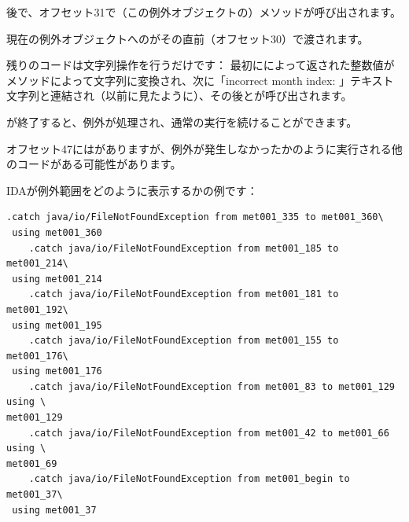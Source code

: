 後で、オフセット31で（この例外オブジェクトの）メソッドが呼び出されます。

現在の例外オブジェクトへのがその直前（オフセット30）で渡されます。

残りのコードは文字列操作を行うだけです：
最初にによって返された整数値がメソッドによって文字列に変換され、次に「incorrect month index: 」テキスト文字列と連結され（以前に見たように）、その後とが呼び出されます。

が終了すると、例外が処理され、通常の実行を続けることができます。

オフセット47にはがありますが、例外が発生しなかったかのように実行される他のコードがある可能性があります。

IDAが例外範囲をどのように表示するかの例です：

\begin{lstlisting}[caption=著者のコンピューターで見つかったランダムな.classファイルから]
    .catch java/io/FileNotFoundException from met001_335 to met001_360\
 using met001_360
    .catch java/io/FileNotFoundException from met001_185 to met001_214\
 using met001_214
    .catch java/io/FileNotFoundException from met001_181 to met001_192\
 using met001_195
    .catch java/io/FileNotFoundException from met001_155 to met001_176\
 using met001_176
    .catch java/io/FileNotFoundException from met001_83 to met001_129 using \
met001_129
    .catch java/io/FileNotFoundException from met001_42 to met001_66 using \
met001_69
    .catch java/io/FileNotFoundException from met001_begin to met001_37\
 using met001_37
\end{lstlisting}